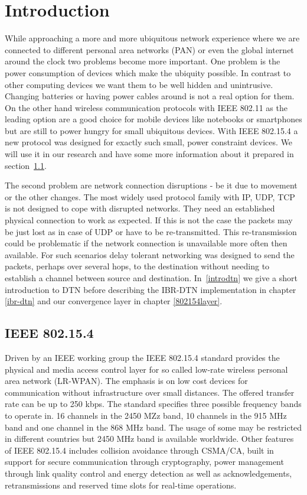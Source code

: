 \chapter{Introduction}
While approaching a more and more ubiquitous network experience where we are
connected to different personal area networks (PAN) or even the global internet
around the clock two problems become more important. One problem is the power
consumption of devices which make the ubiquity possible. In contrast to other
computing devices we want them to be well hidden and unintrusive. Changing
batteries or having power cables around is not a real option for them. On the
other hand wireless communication protocols with IEEE 802.11 \cite{ieee80211} as the
leading option are a good choice for mobile devices like notebooks or
smartphones but are still to power hungry for small ubiquitous devices.
With IEEE 802.15.4 \cite{ieee802154} a new protocol was designed for exactly such
small, power constraint devices. We will use it in our research and have some
more information about it prepared in section~\ref{intro802154}.

The second problem are network connection disruptions - be it due to movement or
the other changes. The most widely used protocol family with IP, UDP, TCP is not
designed to cope with disrupted networks. They need an established physical connection
to work as expected. If this is not the case the packets may be just lost
as in case of UDP or have to be re-transmitted. This re-transmission could be
problematic if the network connection is unavailable more often then available.
For such scenarios delay tolerant networking was designed to send the
packets, perhaps over several hops, to the destination without needing to
establish a channel between source and destination. In~\ref{introdtn} we give a
short introduction to DTN before describing the IBR-DTN implementation in chapter
\ref{ibr-dtn} and our convergence layer in chapter \ref{802154layer}.

\section{IEEE 802.15.4}
\label{intro802154}
Driven by an IEEE working group the IEEE 802.15.4 standard provides the physical and
media access control layer for so called low-rate wireless personal area network
(LR-WPAN). The emphasis is on low cost devices for communication without
infrastructure over small distances. The offered transfer rate can be up to 250 kbps.
The standard specifies three possible frequency bands to operate in. 16 channels
in the 2450 MZz band, 10 channels in the 915 MHz band and one channel in the 868
MHz band. The usage of some may be restricted in different countries but 2450 MHz
band is available worldwide.
Other features of IEEE 802.15.4 includes collision avoidance through CSMA/CA, built
in support for secure communication through cryptography, power management through
link quality control and energy detection as well as acknowledgements,
retransmissions and reserved time slots for real-time operations.

